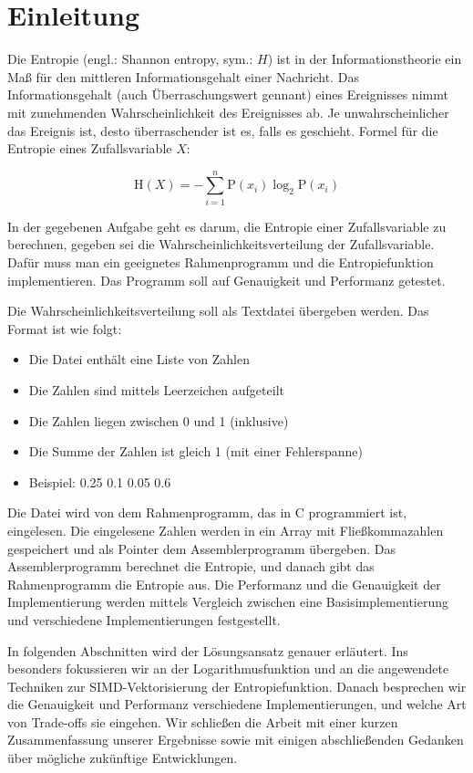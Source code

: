 \section{Einleitung}

Die Entropie (engl.: Shannon entropy, sym.: $H$) ist in der Informationstheorie ein Maß für den mittleren Informationsgehalt einer Nachricht. Das Informationsgehalt (auch Überraschungswert gennant) eines Ereignisses nimmt mit zunehmenden Wahrscheinlichkeit des Ereignisses ab. Je unwahrscheinlicher das Ereignis ist, desto überraschender ist es, falls es geschieht. Formel für die Entropie eines Zufallsvariable $X$:

\begin{equation}
    \mathrm {H} (X)=-\sum _{i=1}^{n}{\mathrm {P} (x_{i})\log_2 \mathrm {P} (x_{i})}
\end{equation}

In der gegebenen Aufgabe geht es darum, die Entropie einer Zufallsvariable zu berechnen, gegeben sei die Wahrscheinlichkeitsverteilung der Zufallsvariable. Dafür muss man ein geeignetes Rahmenprogramm und die Entropiefunktion implementieren. Das Programm soll auf Genauigkeit und Performanz getestet.

Die Wahrscheinlichkeitsverteilung soll als Textdatei übergeben werden. Das Format ist wie folgt:

\begin{itemize}
    \item Die Datei enthält eine Liste von Zahlen
    \item Die Zahlen sind mittels Leerzeichen aufgeteilt
    \item Die Zahlen liegen zwischen 0 und 1 (inklusive)
    \item Die Summe der Zahlen ist gleich 1 (mit einer Fehlerspanne)
    \item Beispiel: 0.25 0.1 0.05 0.6
\end{itemize}

Die Datei wird von dem Rahmenprogramm, das in C programmiert ist, eingelesen. Die eingelesene Zahlen werden in ein Array mit
Fließkommazahlen gespeichert und als Pointer dem Assemblerprogramm übergeben. Das Assemblerprogramm berechnet die Entropie, und danach gibt das Rahmenprogramm die Entropie aus. Die Performanz und die Genauigkeit der Implementierung werden mittels Vergleich zwischen eine Basisimplementierung und verschiedene Implementierungen festgestellt.

In folgenden Abschnitten wird der Lösungsansatz genauer erläutert. Ins besonders fokussieren wir an der Logarithmusfunktion und an die angewendete Techniken zur SIMD-Vektorisierung der Entropiefunktion. Danach besprechen wir die Genauigkeit und Performanz verschiedene Implementierungen, und welche Art von Trade-offs sie eingehen. Wir schließen die Arbeit mit einer kurzen Zusammenfassung unserer Ergebnisse sowie mit einigen abschließenden Gedanken über mögliche zukünftige Entwicklungen.
